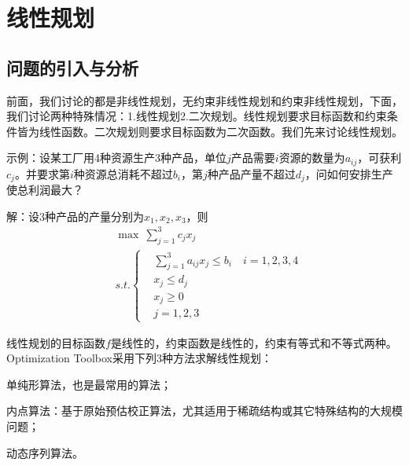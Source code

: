 % 
\chapter{线性规划}

\section{问题的引入与分析}
    \par
    前面，我们讨论的都是非线性规划，无约束非线性规划和约束非线性规划，下面，我们讨论两种特殊情况：1.线性规划2.二次规划。线性规划要求目标函数和约束条件皆为线性函数。二次规划则要求目标函数为二次函数。我们先来讨论线性规划。
    \par
    示例：设某工厂用4种资源生产3种产品，单位$j$产品需要$i$资源的数量为$a_{ij}$，可获利$c_j$。并要求第$i$种资源总消耗不超过$b_i$，第$j$种产品产量不超过$d_j$，问如何安排生产使总利润最大？
    \par
    解：设3种产品的产量分别为$x_1,x_2,x_3$，则
    \begin{align*}
    &{\max}\ \mathop{\sum}\limits_{j=1}^3c_jx_j\\
    &s.t.\left\{
    \begin{aligned}
    &\mathop{\sum}\limits_{j=1}^3a_{ij}x_j \leqslant b_i\quad i=1,2,3,4\\
    &x_j \leqslant d_j\\
    &x_j \geqslant 0\\
    &j=1,2,3
    \end{aligned}
    \right.
    \end{align*}
    \par
    线性规划的目标函数$f$是线性的，约束函数是线性的，约束有等式和不等式两种。Optimization Toolbox采用下列3种方法求解线性规划：
    \par
    单纯形算法，也是最常用的算法；
    \par
    内点算法：基于原始预估校正算法，尤其适用于稀疏结构或其它特殊结构的大规模问题；
    \par
    动态序列算法。
